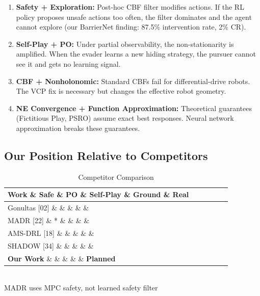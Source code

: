 \documentclass[11pt,a4paper]{report}
\newcommand{\cmark}{\ding{51}}
\newcommand{\xmark}{\ding{55}}
\begin{document}
\begin{enumerate}
    \item \textbf{Safety + Exploration:} Post-hoc CBF filter modifies actions. If the RL policy proposes unsafe actions too often, the filter dominates and the agent cannot explore (our BarrierNet finding: 87.5\% intervention rate, 2\% CR).

    \item \textbf{Self-Play + PO:} Under partial observability, the non-stationarity is amplified. When the evader learns a new hiding strategy, the pursuer cannot see it and gets no learning signal.

    \item \textbf{CBF + Nonholonomic:} Standard CBFs fail for differential-drive robots. The VCP fix is necessary but changes the effective robot geometry.

    \item \textbf{NE Convergence + Function Approximation:} Theoretical guarantees (Fictitious Play, PSRO) assume exact best responses. Neural network approximation breaks these guarantees.
\end{enumerate}

\subsection{Our Position Relative to Competitors}

\begin{table}[h]
\centering
\caption{Competitor Comparison}
\label{tab:competitors}
\begin{tabular}{@{}lccccc@{}}
\toprule
\textbf{Work} \& \textbf{Safe} \& \textbf{PO} \& \textbf{Self-Play} \& \textbf{Ground} \& \textbf{Real} \\
\midrule
Gonultas [02] \& \xmark \& \cmark \& \cmark \& \cmark \& \cmark \\
MADR [22] \& \cmark* \& \cmark \& \xmark \& \cmark \& \cmark \\
AMS-DRL [18] \& \xmark \& \xmark \& \cmark \& \xmark \& \cmark \\
SHADOW [34] \& \xmark \& \cmark \& \xmark \& \cmark \& \xmark \\
\textbf{Our Work} \& \textbf{\cmark} \& \textbf{\cmark} \& \textbf{\cmark} \& \textbf{\cmark} \& \textbf{Planned} \\
\bottomrule
\end{tabular}
\\{\small *MADR uses MPC safety, not learned safety filter}
\end{table}
\end{document}
